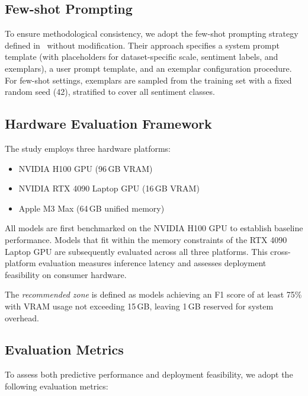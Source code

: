 \documentclass[conference]{IEEEtran}
\begin{document}
\subsection{Few-shot Prompting}

To ensure methodological consistency, we adopt the few-shot prompting strategy defined in~\cite{huang2025explainable} without modification. Their approach specifies a system prompt template (with placeholders for dataset-specific scale, sentiment labels, and exemplars), a user prompt template, and an exemplar configuration procedure. For few-shot settings, exemplars are sampled from the training set with a fixed random seed (42), stratified to cover all sentiment classes. %

\subsection{Hardware Evaluation Framework}

The study employs three hardware platforms:
\begin{itemize}[leftmargin=*,nosep]
\item NVIDIA H100 GPU (96\,GB VRAM)
\item NVIDIA RTX 4090 Laptop GPU (16\,GB VRAM)
\item Apple M3 Max (64\,GB unified memory)
\end{itemize}

All models are first benchmarked on the NVIDIA H100 GPU to establish baseline performance. 
Models that fit within the memory constraints of the RTX 4090 Laptop GPU are subsequently evaluated across all three platforms. 
This cross-platform evaluation measures inference latency and assesses deployment feasibility on consumer hardware.%

The \emph{recommended zone} is defined as models achieving an F1 score of at least 75\% with VRAM usage not exceeding 15\,GB, leaving 1\,GB reserved for system overhead.

\subsection{Evaluation Metrics}

To assess both predictive performance and deployment feasibility, we adopt the following evaluation metrics:
\end{document}
